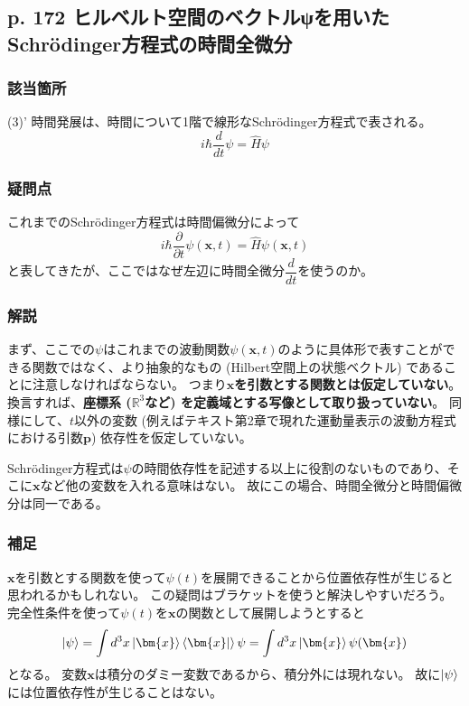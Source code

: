 \documentclass{jsarticle}
\begin{document}
\subsection*{p. 172 ヒルベルト空間のベクトルψを用いたSchrödinger方程式の時間全微分}

\subsubsection*{該当箇所}
(3)' 時間発展は、時間について1階で線形なSchrödinger方程式で表される。
\begin{equation*}
    \tag{6.4}
    i\hbar\dfrac{d}{dt}\psi=\hat{H}\psi
\end{equation*}

\subsubsection*{疑問点}
これまでのSchrödinger方程式は時間偏微分によって
\begin{equation*}
    i\hbar\dfrac{\partial}{\partial t}\psi(\bm{x},t)
    =
    \hat{H}\psi(\bm{x},t)
\end{equation*}
と表してきたが、ここではなぜ左辺に時間全微分$\displaystyle\dfrac{d}{dt}$を使うのか。

\subsubsection*{解説}

まず、ここでの$\psi$はこれまでの波動関数$\psi(\bm{x},t)$のように具体形で表すことができる関数ではなく、より抽象的なもの (Hilbert空間上の状態ベクトル) であることに注意しなければならない。
つまり\textbf{$\bm{x}$を引数とする関数とは仮定していない}。
換言すれば、\textbf{座標系 ($\mathbb{R}^3$など) を定義域とする写像として取り扱っていない}。
同様にして、$t$以外の変数 (例えばテキスト第2章で現れた運動量表示の波動方程式における引数$\bm{p}$) 依存性を仮定していない。

Schrödinger方程式は$\psi$の時間依存性を記述する以上に役割のないものであり、そこに$\bm{x}$など他の変数を入れる意味はない。
故にこの場合、時間全微分と時間偏微分は同一である。

\subsubsection*{補足}
$\bm{x}$を引数とする関数を使って$\psi(t)$を展開できることから位置依存性が生じると思われるかもしれない。
この疑問はブラケットを使うと解決しやすいだろう。
完全性条件を使って$\psi(t)$を$\bm{x}$の関数として展開しようとすると
\begin{equation*}
    \ket{\psi}
    =
    \int d^3x\ket{\bm{x}}\bra{\bm{x}}\ket\psi
    =
    \int d^3x\ket{\bm{x}}\psi(\bm{x})
\end{equation*}
となる。
変数$\bm{x}$は積分のダミー変数であるから、積分外には現れない。
故に$\ket{\psi}$には位置依存性が生じることはない。
\end{document}
